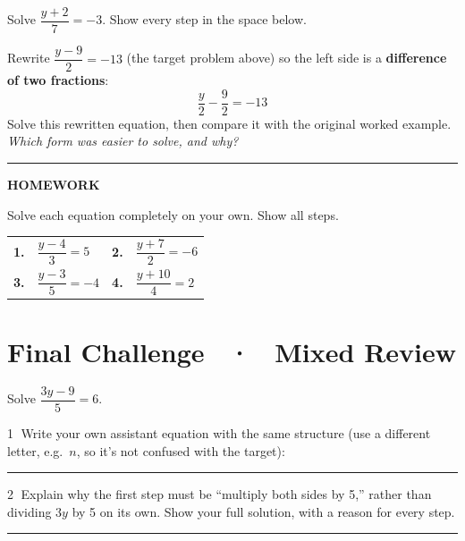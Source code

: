 \documentclass[11pt]{article}
\newcommand{\banner}[2]{%
  \begin{center}
  \colorbox{#1}{\parbox{0.97\linewidth}{\centering\color{white}\bfseries\Large\vspace{1.2mm} #2 \vspace{1.2mm}}}
  \end{center}%
  \vspace{2mm}
}
\begin{document}
\begin{indepbox}
Solve $\dfrac{y+2}{7} = -3$. Show every step in the space below.

\vspace{22mm}
\end{indepbox}

\begin{bonusbox}
Rewrite $\dfrac{y-9}{2}=-13$ (the target problem above) so the left side is a \textbf{difference of two fractions}:
$$\dfrac{y}{2} - \dfrac{9}{2} = -13$$
Solve this rewritten equation, then compare it with the original worked example. \emph{Which form was easier to solve, and why?}

\vspace{6mm}
\rule{\linewidth}{0.3pt}
\end{bonusbox}

\vspace{2mm}
\banner{black!75}{HOMEWORK}
Solve each equation completely on your own. Show all steps.

\begin{tabularx}{\linewidth}{@{}p{0.5cm} X p{0.5cm} X@{}}
\textbf{1.} & $\dfrac{y-4}{3} = 5$ & \textbf{2.} & $\dfrac{y+7}{2} = -6$ \\[10mm]
\textbf{3.} & $\dfrac{y-3}{5} = -4$ & \textbf{4.} & $\dfrac{y+10}{4} = 2$ \\[10mm]
\end{tabularx}

\newpage
\section*{Final Challenge \ · \ Mixed Review}

\begin{targetbox}
Solve \; $\dfrac{3y-9}{5}=6$.
\end{targetbox}

\textcircled{\small 1} Write your own assistant equation with the same structure (use a different letter, e.g.\ $n$, so it's not confused with the target): \rule{6cm}{0.3pt}

\textcircled{\small 2} Explain why the first step must be ``multiply both sides by 5,'' rather than dividing $3y$ by 5 on its own. Show your full solution, with a reason for every step.

\vspace{10mm}

\vspace{2mm}
\hrule
\vspace{3mm}
\end{document}
